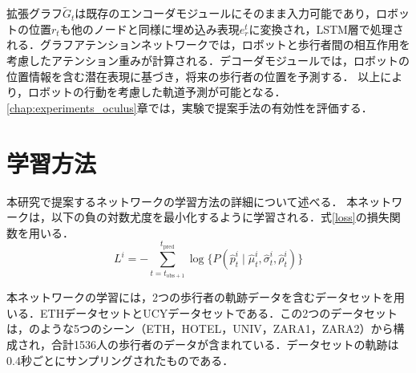 拡張グラフ$\tilde{G}_t$は既存のエンコーダモジュールにそのまま入力可能であり，ロボットの位置$r_t$も他のノードと同様に埋め込み表現$e^t_r$に変換され，LSTM層で処理される．グラフアテンションネットワークでは，ロボットと歩行者間の相互作用を考慮したアテンション重みが計算される．デコーダモジュールでは，ロボットの位置情報を含む潜在表現に基づき，将来の歩行者の位置を予測する．
以上により，ロボットの行動を考慮した軌道予測が可能となる．\ref{chap:experiments_oculus}章では，実験で提案手法の有効性を評価する．

\vspace{-5pt}
\section{学習方法}\label{sec:learning-method}
本研究で提案するネットワークの学習方法の詳細について述べる．
本ネットワークは，以下の負の対数尤度を最小化するように学習される．式\eqref{loss}の損失関数を用いる．
\begin{equation}
  L^i = -\sum_{t=t_{\text{obs}+1}}^{t_{\text{pred}}} \log \{ P(\hat{p}^i_t \mid \hat{\mu}^i_t, \hat{\sigma}^i_t, \hat{\rho}^i_t) \} \label{loss}
\end{equation}

本ネットワークの学習には，2つの歩行者の軌跡データを含むデータセットを用いる．ETHデータセット\cite{pellegrini2009you-eth}とUCYデータセット\cite{lerner2007crowds-ucy}である．この2つのデータセットは，のような5つのシーン（ETH，HOTEL，UNIV，ZARA1，ZARA2）から構成され，合計1536人の歩行者のデータが含まれている．データセットの軌跡は0.4秒ごとにサンプリングされたものである．

